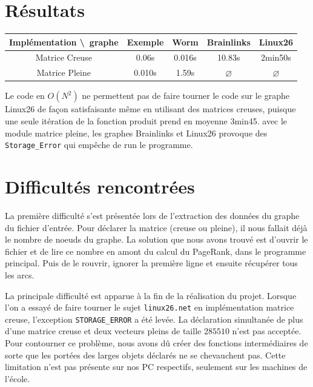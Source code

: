 \documentclass{article}
\begin{document}

\section{Résultats}

\begin{center}
    \begin{tabular}{|c|c|c|c|c|}
        \hline
        Implémentation \textbackslash\ graphe & Exemple & Worm   & Brainlinks    & Linux26       \\
        \hline
        Matrice Creuse                        & 0.06s   & 0.016s & 10.83s        & 2min50s       \\
        \hline
        Matrice Pleine                        & 0.010s  & 1.59s  & $\varnothing$ & $\varnothing$ \\
        \hline
    \end{tabular}
\end{center}

Le code en $O(N^2)$ ne permettent pas de faire tourner le code sur le graphe Linux26 de façon satisfaisante même en utilisant des matrices creuses, puisque une seule itération de la fonction produit prend en moyenne 3min45. avec le module matrice pleine, les graphes Brainlinks et Linux26 provoque des \texttt{Storage\_Error} qui empêche de run le programme.



\section{Difficultés rencontrées}

La première difficulté s'est présentée lors de l'extraction des données du graphe du fichier d'entrée. Pour déclarer la matrice (creuse ou pleine), il nous fallait déjà le nombre de noeuds du graphe. La solution que nous avons trouvé est d'ouvrir le fichier et de lire ce nombre en amont du calcul du PageRank, dans le programme principal. Puis de le rouvrir, ignorer la première ligne et ensuite récupérer tous les arcs.

La principale difficulté est apparue à la fin de la réalisation du projet. Lorsque l'on a essayé de faire tourner le sujet \texttt{linux26.net} en implémentation matrice creuse, l'exception \texttt{STORAGE\_ERROR} a été levée. La déclaration simultanée de plus d'une matrice creuse et deux vecteurs pleins de taille $285510$ n'est pas acceptée. Pour contourner ce problème, nous avons dû créer des fonctions intermédiaires de sorte que les portées des larges objets déclarés ne se chevauchent pas. Cette limitation n'est pas présente sur nos PC respectifs, seulement sur les machines de l'école.
\end{document}
